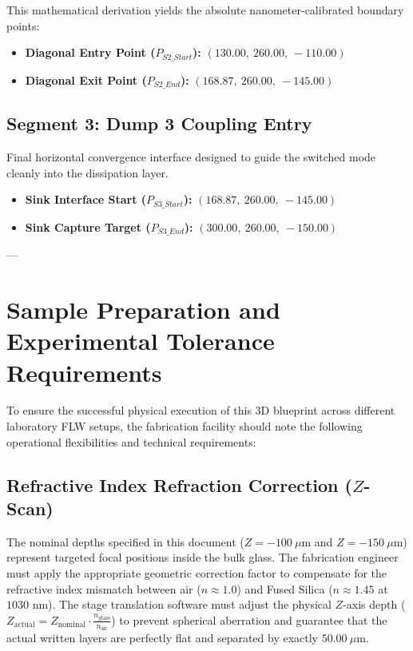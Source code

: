 \documentclass[11pt,a4paper]{article}
\begin{document}
This mathematical derivation yields the absolute nanometer-calibrated boundary points:
\begin{itemize}
    \item \textbf{Diagonal Entry Point ($P_{S2\_Start}$):} $(130.00,\ 260.00,\ -110.00)$
    \item \textbf{Diagonal Exit Point ($P_{S2\_End}$):} $(168.87,\ 260.00,\ -145.00)$
\end{itemize}

\subsection{Segment 3: Dump 3 Coupling Entry}
Final horizontal convergence interface designed to guide the switched mode cleanly into the dissipation layer.
\begin{itemize}
    \item \textbf{Sink Interface Start ($P_{S3\_Start}$):} $(168.87,\ 260.00,\ -145.00)$
    \item \textbf{Sink Capture Target ($P_{S3\_End}$):} $(300.00,\ 260.00,\ -150.00)$
\end{itemize}

---

\section{Sample Preparation and Experimental Tolerance Requirements}
To ensure the successful physical execution of this 3D blueprint across different laboratory FLW setups, the fabrication facility should note the following operational flexibilities and technical requirements:

\subsection{Refractive Index Refraction Correction ($Z$-Scan)}
The nominal depths specified in this document ($Z = -100\ \mu$m and $Z = -150\ \mu$m) represent targeted focal positions inside the bulk glass. The fabrication engineer must apply the appropriate geometric correction factor to compensate for the refractive index mismatch between air ($n \approx 1.0$) and Fused Silica ($n \approx 1.45$ at $1030$ nm). The stage translation software must adjust the physical $Z$-axis depth ($Z_{\text{actual}} = Z_{\text{nominal}} \cdot \frac{n_{\text{glass}}}{n_{\text{air}}}$) to prevent spherical aberration and guarantee that the actual written layers are perfectly flat and separated by exactly $50.00\ \mu$m.
\end{document}
